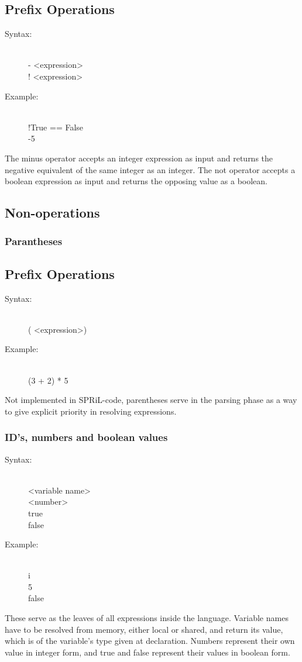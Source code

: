 \documentclass[10pt,a4paper]{report}
\begin{document}
\subsection{Prefix Operations}
\begin{description}
	\item[Syntax:] \hfill \\ 
		- \textless expression\textgreater \\
		! \textless expression\textgreater
	\item[Example:] \hfill \\
		!True == False \\
		-5
\end{description}
The minus operator accepts an integer expression as input and returns the negative equivalent of the same integer as an integer.
The not operator accepts a boolean expression as input and returns the opposing value as a boolean.

\subsection{Non-operations}
\subsubsection*{Parantheses}
\subsection{Prefix Operations}
\begin{description}
	\item[Syntax:] \hfill \\ 
		( \textless expression\textgreater )
	\item[Example:] \hfill \\
		(3 + 2) * 5
\end{description}
Not implemented in SPRiL-code, parentheses serve in the parsing phase as a way to give explicit priority in resolving expressions.

\subsubsection*{ID's, numbers and boolean values}
\begin{description}
	\item[Syntax:] \hfill \\ 
		 \textless variable name\textgreater \\
		 \textless number\textgreater \\
		 true\\
		 false
	\item[Example:] \hfill \\
		i\\
		5\\
		false
\end{description}
These serve as the leaves of all expressions inside the language. Variable names have to be resolved from memory, either local or shared, and return its value, which is of the variable's type given at declaration. Numbers represent their own value in integer form, and true and false represent their values in boolean form.
\end{document}
